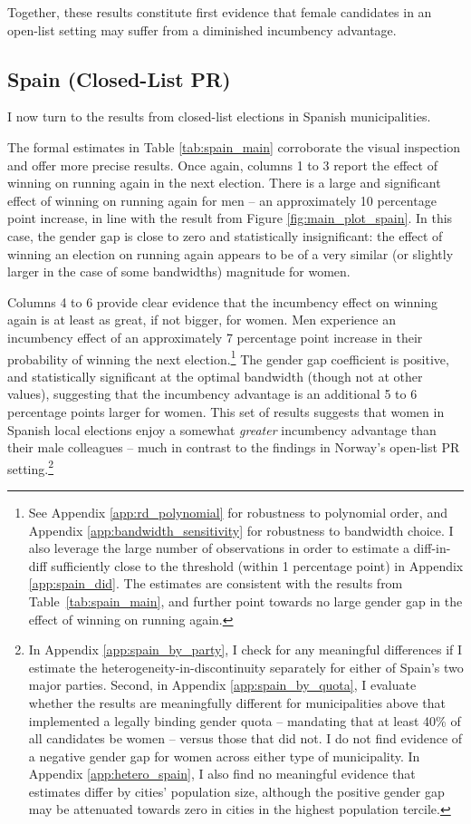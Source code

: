 \documentclass[12pt]{article}
\begin{document}
Together, these results constitute first evidence that female candidates in an open-list setting may suffer from a diminished incumbency advantage.

\subsection{Spain (Closed-List PR)}

I now turn to the results from closed-list elections in Spanish municipalities.

The formal estimates in Table \ref{tab:spain_main} corroborate the visual inspection and offer more precise results.
Once again, columns 1 to 3 report the effect of winning on running again in the next election.
There is a large and significant effect of winning on running again for men -- an approximately 10 percentage point increase, in line with the result from Figure \ref{fig:main_plot_spain}.
In this case, the gender gap is close to zero and statistically insignificant:
the effect of winning an election on running again appears to be of a very similar (or slightly larger in the case of some bandwidths) magnitude for women.



Columns 4 to 6 provide clear evidence that the incumbency effect on winning again is at least as great, if not bigger, for women.
Men experience an incumbency effect of an approximately 7 percentage point increase in their probability of winning the next election.\footnote{See Appendix \ref{app:rd_polynomial} for robustness to polynomial order, and Appendix \ref{app:bandwidth_sensitivity} for robustness to bandwidth choice. I also leverage the large number of observations in order to estimate a diff-in-diff sufficiently close to the threshold (within 1 percentage point) in Appendix \ref{app:spain_did}. The estimates are consistent with the results from Table~\ref{tab:spain_main}, and further point towards no large gender gap in the effect of winning on running again.} The gender gap coefficient is positive, and statistically significant at the optimal bandwidth (though not at other values), suggesting that the incumbency advantage is an additional 5 to 6 percentage points larger for women. This set of results suggests that women in Spanish local elections enjoy a somewhat \emph{greater} incumbency advantage than their male colleagues -- much in contrast to the findings in Norway's open-list PR setting.\footnote{In Appendix \ref{app:spain_by_party}, I check for any meaningful differences if I estimate the heterogeneity-in-discontinuity separately for either of Spain's two major parties. Second, in Appendix \ref{app:spain_by_quota}, I evaluate whether the results are meaningfully different for municipalities above that implemented a legally binding gender quota -- mandating that at least 40\% of all candidates be women -- versus those that did not. I do not find evidence of a negative gender gap for women across either type of municipality. In Appendix \ref{app:hetero_spain}, I also find no meaningful evidence that estimates differ by cities' population size, although the positive gender gap may be attenuated towards zero in cities in the highest population tercile.}
\end{document}
